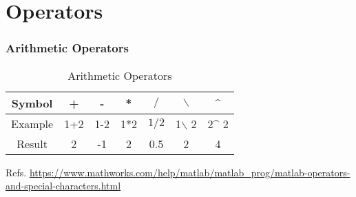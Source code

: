 \documentclass[aspectratio=169]{beamer}
\begin{document}
\section{Operators}
\begin{frame}
  \frametitle{Arithmetic Operators}
  \begin{table}
  \small
   \begin{tabular}{ccccccc}\toprule
    Symbol & +&-&*& $/$&$\backslash$&\^{}\\\midrule
     Example&1+2&1-2&1*2&$1/2$&1$\backslash$ 2&2\^{} 2\\\midrule
     Result&2&-1&2&0.5&2&4\\\bottomrule
   \end{tabular}
   \caption{Arithmetic Operators}
   \end{table}
   
Refs. {\tiny  \url{https://www.mathworks.com/help/matlab/matlab_prog/matlab-operators-and-special-characters.html}}
\end{frame}
\end{document}
